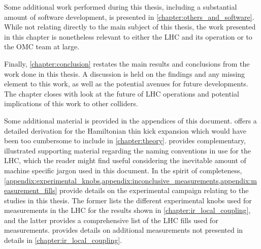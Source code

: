 Some additional work performed during this thesis, including a substantial amount of software development, is presented in \cref{chapter:others_and_software}.
While not relating directly to the main subject of this thesis, the work presented in this chapter is nonetheless relevant to either the \gls{LHC} and its operation or to the \gls{OMC} team at large.

Finally, \cref{chapter:conclusion} restates the main results and conclusions from the work done in this thesis.
A discussion is held on the findings and any missing element to this work, as well as the potential avenues for future developments.
The chapter closes with look at the future of LHC operations and potential implications of this work to other colliders.

Some additional material is provided in the appendices of this document.
 offers a detailed derivation for the Hamiltonian thin kick expansion which would have been too cumbersome to include in \cref{chapter:theory}.
 provides complementary, illustrated supporting material regarding the naming conventions in use for the \gls{LHC}, which the reader might find useful considering the inevitable amount of machine specific jargon used in this document.
In the spirit of completeness, \cref{appendix:experimental_knobs,appendix:inconclusive_measurements,appendix:measurement_fills} provide details on the experimental campaign relating to the studies in this thesis.
The former lists the different experimental knobs used for measurements in the LHC for the results shown in \cref{chapter:ir_local_coupling}, and the latter provides a comprehensive list of the LHC fills used for measurements.
 provides details on additional measurements not presented in details in \cref{chapter:ir_local_coupling}.


\glsresetall                                     %
